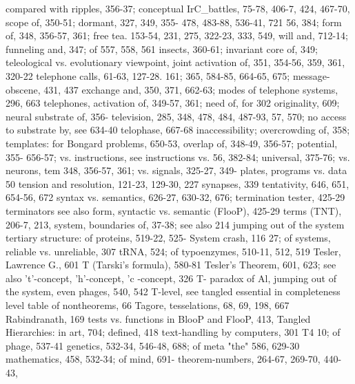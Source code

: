 compared with ripples, 356-37; conceptual       IrC\_battles, 75-78, 406-7, 424, 467-70,
scope of, 350-51; dormant, 327, 349, 355-       478, 483-88, 536-41, 721
56, 384; form of, 348, 356-57, 361; free        tea. 153-54, 231, 275, 322-23, 333, 549,
will and, 712-14; funneling and, 347; of        557, 558, 561
insects, 360-61; invariant core of, 349;        teleological vs. evolutionary viewpoint,
joint activation of, 351, 354-56, 359, 361,     320-22 telephone calls, 61-63, 127-28. 161;
365, 584-85, 664-65, 675; message-              obscene, 431, 437
exchange and, 350, 371, 662-63; modes of        telephone systems, 296, 663 telephones,
activation of, 349-57, 361; need of, for        302
originality, 609; neural substrate of, 356-     television, 285, 348, 478, 484, 487-93,
57, 570; no access to substrate by, see         634-40 telophase, 667-68
inaccessibility; overcrowding of, 358;          templates: for Bongard problems, 650-53,
overlap of, 348-49, 356-57; potential, 355-     656-57; vs. instructions, see instructions vs.
56, 382-84; universal, 375-76; vs. neurons,     tem
348, 356-57, 361; vs. signals, 325-27, 349-     plates, programs vs. data
50                                              tension and resolution, 121-23, 129-30, 227
synapses, 339                                   tentativity, 646, 651, 654-56, 672
syntax vs. semantics, 626-27, 630-32, 676;      termination tester, 425-29 terminators
see also form, syntactic vs. semantic           (FlooP), 425-29 terms (TNT), 206-7, 213,
system, boundaries of, 37-38; see also          214
jumping out of the system                       tertiary structure: of proteins, 519-22, 525-
System crash, 116                               27; of
systems, reliable vs. unreliable, 307           tRNA, 524; of typoenzymes, 510-11, 512,
                                                519 Tesler, Lawrence G., 601
T (Tarski's formula), 580-81                    Tesler's Theorem, 601, 623; see also
't'-concept, 'h'-concept, 'c -concept, 326 T-   paradox of Al, jumping out of the system,
even phages, 540, 542 T-level, see tangled      essential in completeness
level table of nontheorems, 66 Tagore,          tesselations, 68, 69, 198, 667
Rabindranath, 169                               tests vs. functions in BlooP and FlooP, 413,
Tangled Hierarchies: in art, 704; defined,      418 text-handling by computers, 301 T4
10; of                                          phage, 537-41
genetics, 532-34, 546-48, 688; of meta          "the" 586, 629-30
mathematics, 458, 532-34; of mind, 691-         theorem-numbers, 264-67, 269-70, 440-43,
